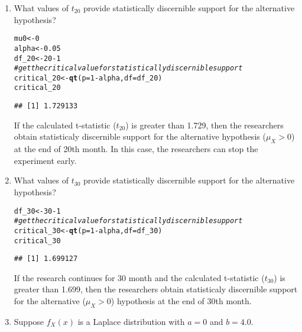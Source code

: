 \documentclass{article}\usepackage[]{graphicx}\usepackage[]{xcolor}
\makeatletter
\newcommand{\hlnum}[1]{\textcolor[rgb]{0.686,0.059,0.569}{#1}}%
\newcommand{\hlcom}[1]{\textcolor[rgb]{0.678,0.584,0.686}{\textit{#1}}}%
\newcommand{\hlopt}[1]{\textcolor[rgb]{0,0,0}{#1}}%
\newcommand{\hldef}[1]{\textcolor[rgb]{0.345,0.345,0.345}{#1}}%
\newcommand{\hlkwb}[1]{\textcolor[rgb]{0.69,0.353,0.396}{#1}}%
\newcommand{\hlkwc}[1]{\textcolor[rgb]{0.333,0.667,0.333}{#1}}%
\newcommand{\hlkwd}[1]{\textcolor[rgb]{0.737,0.353,0.396}{\textbf{#1}}}%
\newenvironment{kframe}{%
 \def\at@end@of@kframe{}%
 \ifinner\ifhmode%
  \def\at@end@of@kframe{\end{minipage}}%
  \begin{minipage}{\columnwidth}%
 \fi\fi%
 \def\FrameCommand##1{\hskip\@totalleftmargin \hskip-\fboxsep
 \colorbox{shadecolor}{##1}\hskip-\fboxsep
     \hskip-\linewidth \hskip-\@totalleftmargin \hskip\columnwidth}%
 \MakeFramed {\advance\hsize-\width
   \@totalleftmargin\z@ \linewidth\hsize
   \@setminipage}}%
 {\par\unskip\endMakeFramed%
 \at@end@of@kframe}
\newenvironment{knitrout}{}{} %
\makeatother
\begin{document}
\begin{enumerate}
\begin{enumerate}
  \item What values of $t_{20}$ provide statistically discernible support for the
  alternative hypothesis?
\begin{knitrout}\scriptsize
{}\color{fgcolor}\begin{kframe}
\begin{alltt}
\hldef{mu0} \hlkwb{<-} \hlnum{0}
\hldef{alpha} \hlkwb{<-} \hlnum{0.05}
\hldef{df_20} \hlkwb{<-} \hlnum{20} \hlopt{-}\hlnum{1}
\hlcom{#get the critical value for statistically discernible support}
\hldef{critical_20} \hlkwb{<-} \hlkwd{qt}\hldef{(}\hlkwc{p} \hldef{=} \hlnum{1} \hlopt{-} \hldef{alpha,} \hlkwc{df} \hldef{= df_20)}
\hldef{critical_20}
\end{alltt}
\begin{verbatim}
## [1] 1.729133
\end{verbatim}
\end{kframe}
\end{knitrout}
If the calculated t-statistic ($t_{20}$) is greater than 1.729, then the researchers obtain statisticaly discernible support for the alternative hypothesis ($\mu_X > 0$) at the end of 20th month. In this case, the researchers can stop the experiment early.
  \item What values of $t_{30}$ provide statistically discernible support for the
  alternative hypothesis?
\begin{knitrout}\scriptsize
{}\color{fgcolor}\begin{kframe}
\begin{alltt}
\hldef{df_30} \hlkwb{<-} \hlnum{30} \hlopt{-}\hlnum{1}
\hlcom{#get the critical value for statistically discernible support}
\hldef{critical_30} \hlkwb{<-} \hlkwd{qt}\hldef{(}\hlkwc{p} \hldef{=} \hlnum{1} \hlopt{-} \hldef{alpha,} \hlkwc{df} \hldef{= df_30)}
\hldef{critical_30}
\end{alltt}
\begin{verbatim}
## [1] 1.699127
\end{verbatim}
\end{kframe}
\end{knitrout}
If the research continues for 30 month and the calculated t-statistic ($t_{30}$) is greater than 1.699, then the researchers obtain statisticaly discernible support for the alternative ($\mu_X > 0$) hypothesis at the end of 30th month.
  \item Suppose $f_X(x)$ is a Laplace distribution with $a=0$ and $b=4.0$.

\end{enumerate}
\end{enumerate}
\end{document}
